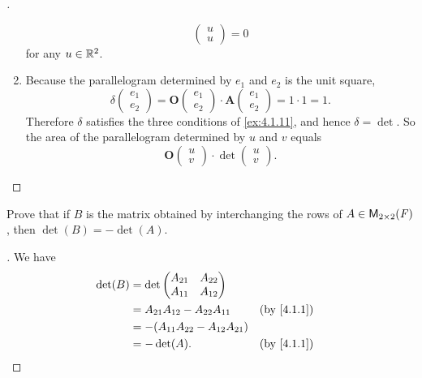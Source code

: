 \begin{proof}[]
\begin{enumerate}
\[\begin{pmatrix}
              u \\
              u
            \end{pmatrix} = 0
          \]
          for any \(u \in \mathbb{R}^2\).
    \item Because the parallelogram determined by \(e_1\) and \(e_2\) is the unit square,
          \[
            \delta\begin{pmatrix}
              e_1 \\
              e_2
            \end{pmatrix} = \mathbf{O}\begin{pmatrix}
              e_1 \\
              e_2
            \end{pmatrix} \cdot \mathbf{A}\begin{pmatrix}
              e_1 \\
              e_2
            \end{pmatrix} = 1 \cdot 1 = 1.
          \]
          Therefore \(\delta\) satisfies the three conditions of \cref{ex:4.1.11}, and hence \(\delta = \det\).
          So the area of the parallelogram determined by \(u\) and \(v\) equals
          \[
            \mathbf{O}\begin{pmatrix}
              u \\
              v
            \end{pmatrix} \cdot \det\begin{pmatrix}
              u \\
              v
            \end{pmatrix}.
          \]
  \end{enumerate}
\end{proof}

\exercisesection

\setcounter{ex}{4}
\begin{ex}\label{ex:4.1.5}
  Prove that if \(B\) is the matrix obtained by interchanging the rows of \(A \in \mathsf{M}_{{2} \times 2}({\mathit{F}})\), then \(\det(B) = -\det(A)\).
\end{ex}

\begin{proof}[]
  We have
  \begin{align*}
    \det(B) & = \det\begin{pmatrix}
                      A_{2 1} & A_{2 2} \\
                      A_{1 1} & A_{1 2}
                    \end{pmatrix}                                              \\
            & = A_{2 1} A_{1 2} - A_{2 2} A_{1 1}    &  & \text{(by \cref{4.1.1})} \\
            & = -(A_{1 1} A_{2 2} - A_{1 2} A_{2 1})                               \\
            & = -\det(A).                            &  & \text{(by \cref{4.1.1})}
  \end{align*}
\end{proof}

